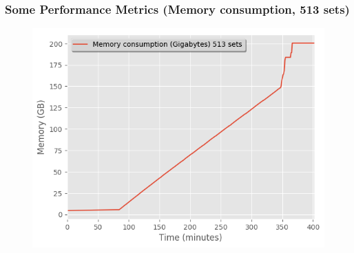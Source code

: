 \documentclass[9pt,sansserif]{beamer}
\begin{document}

\begin{frame}{}\small
\frametitle{Some Performance Metrics (Memory consumption, 513 sets) }

\begin{figure}[hb!]
\centering\leavevmode
\graphicspath{{./png/Benchmarks/}}
%
\hspace{-4cm}
\begin{minipage}{10cm}
\centering\leavevmode
\includegraphics[scale=0.55]{Fig_513.png}
\end{minipage}
\end{figure}
\end{frame}


\end{document}
